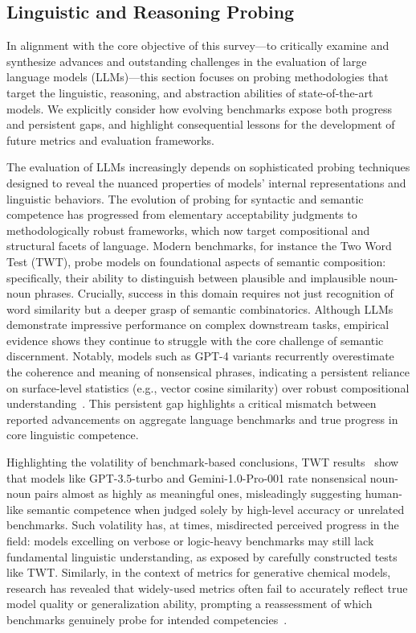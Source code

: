 \documentclass[sigconf]{acmart}
\begin{document}
\subsection{Linguistic and Reasoning Probing}

In alignment with the core objective of this survey---to critically examine and synthesize advances and outstanding challenges in the evaluation of large language models (LLMs)---this section focuses on probing methodologies that target the linguistic, reasoning, and abstraction abilities of state-of-the-art models. We explicitly consider how evolving benchmarks expose both progress and persistent gaps, and highlight consequential lessons for the development of future metrics and evaluation frameworks.

The evaluation of LLMs increasingly depends on sophisticated probing techniques designed to reveal the nuanced properties of models' internal representations and linguistic behaviors. The evolution of probing for syntactic and semantic competence has progressed from elementary acceptability judgments to methodologically robust frameworks, which now target compositional and structural facets of language. Modern benchmarks, for instance the Two Word Test (TWT), probe models on foundational aspects of semantic composition: specifically, their ability to distinguish between plausible and implausible noun-noun phrases. Crucially, success in this domain requires not just recognition of word similarity but a deeper grasp of semantic combinatorics. Although LLMs demonstrate impressive performance on complex downstream tasks, empirical evidence shows they continue to struggle with the core challenge of semantic discernment. Notably, models such as GPT-4 variants recurrently overestimate the coherence and meaning of nonsensical phrases, indicating a persistent reliance on surface-level statistics (e.g., vector cosine similarity) over robust compositional understanding~\cite{ref96}. This persistent gap highlights a critical mismatch between reported advancements on aggregate language benchmarks and true progress in core linguistic competence.

Highlighting the volatility of benchmark-based conclusions, TWT results~\cite{ref96} show that models like GPT-3.5-turbo and Gemini-1.0-Pro-001 rate nonsensical noun-noun pairs almost as highly as meaningful ones, misleadingly suggesting human-like semantic competence when judged solely by high-level accuracy or unrelated benchmarks. Such volatility has, at times, misdirected perceived progress in the field: models excelling on verbose or logic-heavy benchmarks may still lack fundamental linguistic understanding, as exposed by carefully constructed tests like TWT. Similarly, in the context of metrics for generative chemical models, research has revealed that widely-used metrics often fail to accurately reflect true model quality or generalization ability, prompting a reassessment of which benchmarks genuinely probe for intended competencies~\cite{ref91}.
\end{document}
